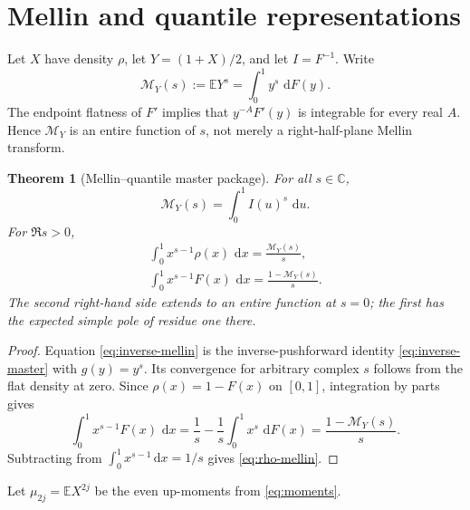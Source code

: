 \documentclass[11pt]{article}
\newtheorem{theorem}{Theorem}[section]
\theoremstyle{definition}
\theoremstyle{remark}
\newcommand{\C}{\mathbb C}
\newcommand{\E}{\mathbb E}
\newcommand{\dd}{\,\mathrm d}
\begin{document}
\section{Mellin and quantile representations}
\label{sec:mellin-quantile}

Let \(X\) have density \(\rho\), let \(Y=(1+X)/2\), and let
\(I=F^{-1}\).  Write
\begin{equation}
 \mathcal M_Y(s):=\E Y^s=\int_0^1y^s\,\dd F(y).             \label{eq:MY-def}
\end{equation}
The endpoint flatness of \(F'\) implies that \(y^{-A}F'(y)\) is integrable for every
real \(A\).  Hence \(\mathcal M_Y\) is an entire function of \(s\), not merely a
right-half-plane Mellin transform.

\begin{theorem}[Mellin--quantile master package]
\label{thm:mellin-master}
For all \(s\in\C\),
\begin{equation}
\boxed{
 \mathcal M_Y(s)=\int_0^1 I(u)^s\,\dd u.}                  \label{eq:inverse-mellin}
\end{equation}
For \(\Re s>0\),
\begin{align}
 \boxed{
 \int_0^1x^{s-1}\rho(x)\,\dd x
 =\frac{\mathcal M_Y(s)}s,}                               \label{eq:rho-mellin}\\
 \boxed{
 \int_0^1x^{s-1}F(x)\,\dd x
 =\frac{1-\mathcal M_Y(s)}s.}                             \label{eq:F-mellin}
\end{align}
The second right-hand side extends to an entire function at \(s=0\); the first has the
expected simple pole of residue one there.
\end{theorem}

\begin{proof}
Equation \eqref{eq:inverse-mellin} is the inverse-pushforward identity
\eqref{eq:inverse-master} with \(g(y)=y^s\).  Its convergence for arbitrary complex
\(s\) follows from the flat density at zero.  Since \(\rho(x)=1-F(x)\) on \([0,1]\),
integration by parts gives
\[
 \int_0^1x^{s-1}F(x)\,\dd x
 =\frac1s-\frac1s\int_0^1x^s\,\dd F(x)
 =\frac{1-\mathcal M_Y(s)}s.
\]
Subtracting from \(\int_0^1x^{s-1}\dd x=1/s\) gives
\eqref{eq:rho-mellin}.
\end{proof}

Let \(\mu_{2j}=\E X^{2j}\) be the even up-moments from \eqref{eq:moments}.
\end{document}
